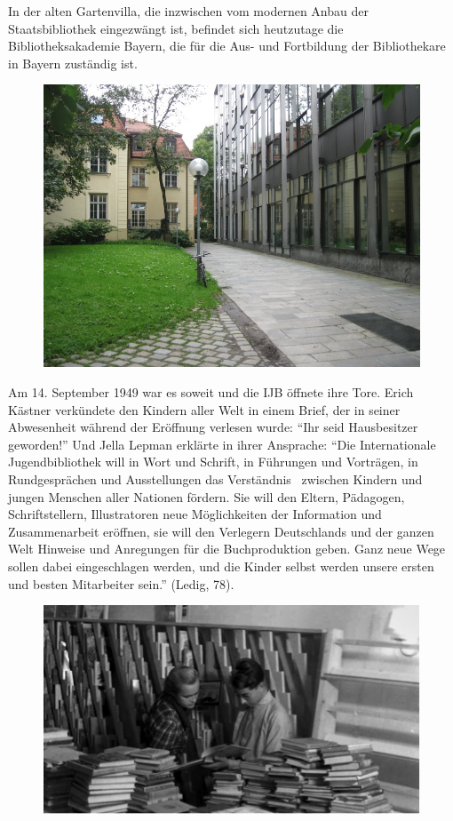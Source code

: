 \documentclass[a4paper,
fontsize=11pt,
oneside,
numbers=noperiodatend,
parskip=half-,
bibliography=totoc,
final
]{scrartcl}
\begin{document}
In der alten Gartenvilla, die inzwischen vom modernen Anbau der
Staatsbibliothek eingezwängt ist, befindet sich heutzutage die
Bibliotheksakademie Bayern, die für die Aus- und Fortbildung der
Bibliothekare in Bayern zuständig ist.

\begin{figure}[htbp]
\centering
\includegraphics{img/bild8.jpg}
\end{figure}

Am 14. September 1949 war es soweit und die IJB öffnete ihre Tore. Erich
Kästner verkündete den Kindern aller Welt in einem Brief, der in seiner
Abwesenheit während der Eröffnung verlesen wurde: \enquote{Ihr seid
Hausbesitzer geworden!} Und Jella Lepman erklärte in ihrer Ansprache:
\enquote{Die Internationale Jugendbibliothek will in Wort und Schrift,
in Führungen und Vorträgen, in Rundgesprächen und Ausstellungen das
Verständnis~ zwischen Kindern und jungen Menschen aller Nationen
fördern. Sie will den Eltern, Pädagogen, Schriftstellern, Illustratoren
neue Möglichkeiten der Information und Zusammenarbeit eröffnen, sie will
den Verlegern Deutschlands und der ganzen Welt Hinweise und Anregungen
für die Buchproduktion geben. Ganz neue Wege sollen dabei eingeschlagen
werden, und die Kinder selbst werden unsere ersten und besten
Mitarbeiter sein.} (Ledig, 78).

\begin{figure}[htbp]
\centering
\includegraphics{img/bild8b.jpg}
\end{figure}
\end{document}
